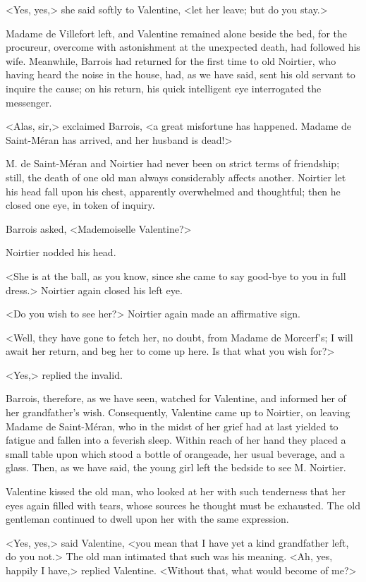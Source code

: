  <Yes, yes,> she said softly to Valentine, <let her leave; but do you stay.> 

 Madame de Villefort left, and Valentine remained alone beside the bed, for the procureur, overcome with astonishment at the unexpected death, had followed his wife. Meanwhile, Barrois had returned for the first time to old Noirtier, who having heard the noise in the house, had, as we have said, sent his old servant to inquire the cause; on his return, his quick intelligent eye interrogated the messenger. 

 <Alas, sir,> exclaimed Barrois, <a great misfortune has happened. Madame de Saint-Méran has arrived, and her husband is dead!> 

 M. de Saint-Méran and Noirtier had never been on strict terms of friendship; still, the death of one old man always considerably affects another. Noirtier let his head fall upon his chest, apparently overwhelmed and thoughtful; then he closed one eye, in token of inquiry. 

 Barrois asked, <Mademoiselle Valentine?> 

 Noirtier nodded his head. 

 <She is at the ball, as you know, since she came to say good-bye to you in full dress.> Noirtier again closed his left eye. 

 <Do you wish to see her?> Noirtier again made an affirmative sign. 

 <Well, they have gone to fetch her, no doubt, from Madame de Morcerf's; I will await her return, and beg her to come up here. Is that what you wish for?> 

 <Yes,> replied the invalid. 

 Barrois, therefore, as we have seen, watched for Valentine, and informed her of her grandfather's wish. Consequently, Valentine came up to Noirtier, on leaving Madame de Saint-Méran, who in the midst of her grief had at last yielded to fatigue and fallen into a feverish sleep. Within reach of her hand they placed a small table upon which stood a bottle of orangeade, her usual beverage, and a glass. Then, as we have said, the young girl left the bedside to see M. Noirtier. 

 Valentine kissed the old man, who looked at her with such tenderness that her eyes again filled with tears, whose sources he thought must be exhausted. The old gentleman continued to dwell upon her with the same expression. 

 <Yes, yes,> said Valentine, <you mean that I have yet a kind grandfather left, do you not.> The old man intimated that such was his meaning. <Ah, yes, happily I have,> replied Valentine. <Without that, what would become of me?> 

